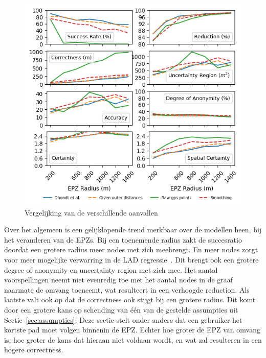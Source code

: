 \begin{figure}[h]
    \centering
    \includegraphics[width=\textwidth]{fig/result_graphs/all_results.png}
    \caption{Vergelijking van de verschillende aanvallen}\label{fig:attack_comparison}
\end{figure}

Over het algemeen is een gelijklopende trend merkbaar over de modellen heen,
bij het veranderen van de \acp{EPZ}. Bij een toenemende radius zakt de
succesratio doordat een grotere radius meer nodes met zich meebrengt. En meer
nodes zorgt voor meer mogelijke verwarring in de \ac{LAD}
regressie~\cite{Verdonck_2022}. Dit brengt ook een grotere degree of anonymity
en uncertainty region met zich mee. Het aantal voorspellingen neemt niet
evenredig toe met het aantal nodes in de graaf naarmate de omvang toeneemt, wat
resulteert in een verhoogde reduction. Als laatste valt ook op dat de
correctness ook stijgt bij een grotere radius. Dit komt door een grotere kans
op schending van één van de gestelde assumpties uit
Sectie~\ref{sec:assumpties}. Deze sectie stelt onder andere dat een gebruiker
het kortste pad moet volgen binnenin de \ac{EPZ}. Echter hoe groter de \ac{EPZ}
van omvang is, hoe groter de kans dat hieraan niet voldaan wordt, en wat zal
resulteren in een hogere correctness.

